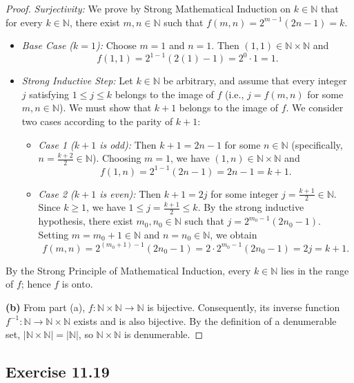 \documentclass[11pt, letterpaper]{article}
\theoremstyle{definition}
\theoremstyle{remark}
\begin{document}
\begin{proof}
\emph{Surjectivity:} We prove by Strong Mathematical Induction on $k \in \mathbb{N}$ that for every $k \in \mathbb{N}$, there exist $m, n \in \mathbb{N}$ such that $f(m, n) = 2^{m-1}(2n - 1) = k$.
\begin{itemize}
    \item \emph{Base Case ($k = 1$):} Choose $m = 1$ and $n = 1$. Then $(1, 1) \in \mathbb{N} \times \mathbb{N}$ and
    \[
    f(1, 1) = 2^{1-1}(2(1) - 1) = 2^0 \cdot 1 = 1.
    \]
    \item \emph{Strong Inductive Step:} Let $k \in \mathbb{N}$ be arbitrary, and assume that every integer $j$ satisfying $1 \le j \le k$ belongs to the image of $f$ (i.e., $j = f(m, n)$ for some $m, n \in \mathbb{N}$). We must show that $k + 1$ belongs to the image of $f$. We consider two cases according to the parity of $k + 1$:
    \begin{itemize}
        \item \emph{Case 1 ($k + 1$ is odd):} Then $k + 1 = 2n - 1$ for some $n \in \mathbb{N}$ (specifically, $n = \frac{k+2}{2} \in \mathbb{N}$). Choosing $m = 1$, we have $(1, n) \in \mathbb{N} \times \mathbb{N}$ and
        \[
        f(1, n) = 2^{1-1}(2n - 1) = 2n - 1 = k + 1.
        \]
        \item \emph{Case 2 ($k + 1$ is even):} Then $k + 1 = 2j$ for some integer $j = \frac{k+1}{2} \in \mathbb{N}$. Since $k \ge 1$, we have $1 \le j = \frac{k+1}{2} \le k$. By the strong inductive hypothesis, there exist $m_0, n_0 \in \mathbb{N}$ such that $j = 2^{m_0 - 1}(2n_0 - 1)$. Setting $m = m_0 + 1 \in \mathbb{N}$ and $n = n_0 \in \mathbb{N}$, we obtain
        \[
        f(m, n) = 2^{(m_0 + 1) - 1}(2n_0 - 1) = 2 \cdot 2^{m_0 - 1}(2n_0 - 1) = 2j = k + 1.
        \]
    \end{itemize}
\end{itemize}
By the Strong Principle of Mathematical Induction, every $k \in \mathbb{N}$ lies in the range of $f$; hence $f$ is onto.

\textbf{(b)} From part (a), $f : \mathbb{N} \times \mathbb{N} \to \mathbb{N}$ is bijective. Consequently, its inverse function $f^{-1} : \mathbb{N} \to \mathbb{N} \times \mathbb{N}$ exists and is also bijective. By the definition of a denumerable set, $|\mathbb{N} \times \mathbb{N}| = |\mathbb{N}|$, so $\mathbb{N} \times \mathbb{N}$ is denumerable.
\end{proof}

\subsection{Exercise 11.19}
\end{document}
